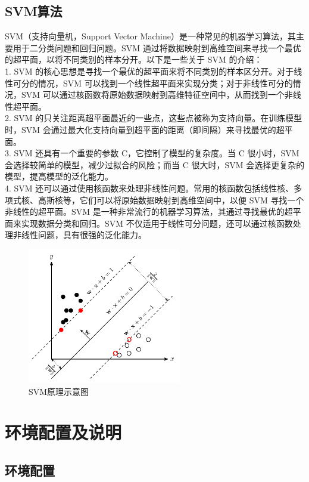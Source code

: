 \documentclass[UTF8]{ctexart}
\begin{document}
\subsection{SVM算法}
SVM（支持向量机，Support Vector Machine）是一种常见的机器学习算法，其主要用于二分类问题和回归问题。SVM 通过将数据映射到高维空间来寻找一个最优的超平面，以将不同类别的样本分开。以下是一些关于 SVM 的介绍：\\
1. SVM 的核心思想是寻找一个最优的超平面来将不同类别的样本区分开。对于线性可分的情况，SVM 可以找到一个线性超平面来实现分类；对于非线性可分的情况，SVM 可以通过核函数将原始数据映射到高维特征空间中，从而找到一个非线性超平面。\\
2. SVM 的只关注距离超平面最近的一些点，这些点被称为支持向量。在训练模型时，SVM 会通过最大化支持向量到超平面的距离（即间隔）来寻找最优的超平面。\\
3. SVM 还具有一个重要的参数 C，它控制了模型的复杂度。当 C 很小时，SVM 会选择较简单的模型，减少过拟合的风险；而当 C 很大时，SVM 会选择更复杂的模型，提高模型的泛化能力。\\
4. SVM 还可以通过使用核函数来处理非线性问题。常用的核函数包括线性核、多项式核、高斯核等，它们可以将原始数据映射到高维空间中，以便 SVM 寻找一个非线性的超平面。SVM 是一种非常流行的机器学习算法，其通过寻找最优的超平面来实现数据分类和回归。SVM 不仅适用于线性可分问题，还可以通过核函数处理非线性问题，具有很强的泛化能力。
\begin{figure}[H]
    \centering
    \includegraphics[width=0.6\textwidth]{pic/SVM原理示意图.png}
    \caption{SVM原理示意图}
    \label{fig:demo}
\end{figure}

\section{环境配置及说明}
\subsection{环境配置}
\end{document}

